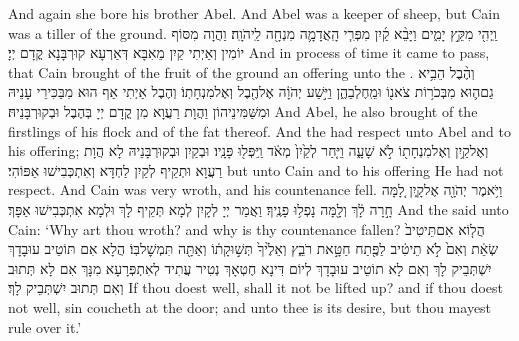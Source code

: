 {And again she bore his brother Abel. And Abel was a keeper of sheep, but Cain was a tiller of the ground.}{}
{וַֽיְהִ֖י מִקֵּ֣ץ יָמִ֑ים וַיָּבֵ֨א קַ֜יִן מִפְּרִ֧י הָֽאֲדָמָ֛ה מִנְחָ֖ה לַֽיהֹוָֽה׃}
{וַהֲוָה מִסּוֹף יוֹמִין וְאַיְתִי קַיִן מֵאִבָּא דְּאַרְעָא קוּרְבָּנָא קֳדָם יְיָ׃}
{And in process of time it came to pass, that Cain brought of the fruit of the ground an offering unto the \lord.}{}
{וְהֶ֨בֶל הֵבִ֥יא גַם\maqqaf ה֛וּא מִבְּכֹר֥וֹת צֹאנ֖וֹ וּמֵֽחֶלְבֵהֶ֑ן וַיִּ֣שַׁע יְהֹוָ֔ה אֶל\maqqaf הֶ֖בֶל וְאֶל\maqqaf מִנְחָתֽוֹ׃}
{וְהֶבֶל אַיְתִי אַף הוּא מִבַּכִּירֵי עָנֵיהּ וּמִשַּׁמִּינֵיהוֹן וַהֲוָת רַעֲוָא מִן קֳדָם יְיָ בְּהֶבֶל וּבְקוּרְבָּנֵיהּ׃}
{And Abel, he also brought of the firstlings of his flock and of the fat thereof. And the \lord\space had respect unto Abel and to his offering;}{}
{וְאֶל\maqqaf קַ֥יִן וְאֶל\maqqaf מִנְחָת֖וֹ לֹ֣א שָׁעָ֑ה וַיִּ֤חַר לְקַ֙יִן֙ מְאֹ֔ד וַֽיִּפְּל֖וּ פָּנָֽיו׃}
{וּבְקַיִן וּבְקוּרְבָּנֵיהּ לָא הֲוָת רַעֲוָא וּתְקֵיף לְקַיִן לַחְדָּא וְאִתְכְּבִישׁוּ אַפּוֹהִי׃}
{but unto Cain and to his offering He had not respect. And Cain was very wroth, and his countenance fell.}{}
{וַיֹּ֥אמֶר יְהֹוָ֖ה אֶל\maqqaf קָ֑יִן לָ֚מָּה חָ֣רָה לָ֔ךְ וְלָ֖מָּה נָפְל֥וּ פָנֶֽיךָ׃}
{וַאֲמַר יְיָ לְקָיִן לְמָא תְּקֵיף לָךְ וּלְמָא אִתְכְּבִישׁוּ אַפָּךְ׃}
{And the \lord\space said unto Cain: ‘Why art thou wroth? and why is thy countenance fallen?}{}
{הֲל֤וֹא אִם\maqqaf תֵּיטִיב֙ שְׂאֵ֔ת וְאִם֙ לֹ֣א תֵיטִ֔יב לַפֶּ֖תַח חַטָּ֣את רֹבֵ֑ץ וְאֵלֶ֙יךָ֙ תְּשׁ֣וּקָת֔וֹ וְאַתָּ֖ה תִּמְשׇׁל\maqqaf בּֽוֹ׃}
{הֲלָא אִם תּוֹטֵיב עוּבָדָךְ יִשְׁתְּבֵיק לָךְ וְאִם לָא תוֹטֵיב עוּבָדָךְ לְיוֹם דִּינָא חֶטְאָךְ נְטִיר עֲתִיד לְאִתְפְּרָעָא מִנָּךְ אִם לָא תְּתוּב וְאִם תְּתוּב יִשְׁתְּבֵיק לָךְ׃}
{If thou doest well, shall it not be lifted up? and if thou doest not well, sin coucheth at the door; and unto thee is its desire, but thou mayest rule over it.’}{}
